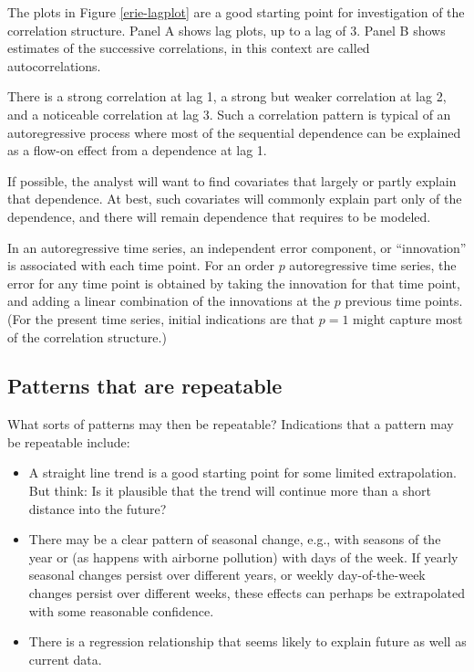 The plots in Figure \ref{erie-lagplot} are a good starting point for
investigation of the correlation structure.  Panel A shows lag plots,
up to a lag of 3.  Panel B shows estimates of the successive
correlations, in this context are called autocorrelations.

There is a strong correlation at lag 1, a strong but weaker
correlation at lag 2, and a noticeable correlation at lag 3.  Such
a correlation pattern is typical of an autoregressive process where
most of the sequential dependence can be explained as a flow-on
effect from a dependence at lag 1.

If possible, the analyst will want to find covariates
that largely or partly explain that dependence.  At best, such
covariates will commonly explain part only of the dependence,
and there will remain dependence that requires to be modeled.

In an autoregressive time series, an  independent error component, or ``innovation'' is
associated with each time point. For an order $p$ autoregressive time
series, the error for any time point is obtained by taking the
innovation for that time point, and adding a linear combination of the
innovations at the $p$ previous time points.  (For the present time
series, initial indications are that $p=1$ might capture most of the
correlation structure.)

\subsection{Patterns that are repeatable}


What sorts of patterns may then be repeatable?  Indications that a
pattern may be repeatable include:
\begin{itemize}
\item A straight line trend is a good starting point for some
  limited extrapolation. But think: Is it plausible that the trend
  will continue more than a short distance into the future?
\item There may be a clear pattern of seasonal change, e.g.,
with seasons of the year or (as happens with airborne pollution)
with days of the week. If yearly seasonal changes persist over
different years, or weekly day-of-the-week changes persist over
different weeks, these effects can perhaps be extrapolated with
some reasonable confidence.
\item There is a regression relationship that seems likely to
explain future as well as current data.
\end{itemize}

